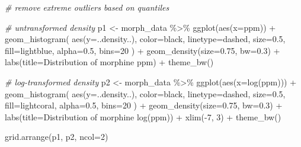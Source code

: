 \documentclass[
  11pt,
]{article}
\newenvironment{Shaded}{\begin{snugshade}}{\end{snugshade}}
\newcommand{\AttributeTok}[1]{\textcolor[rgb]{0.77,0.63,0.00}{#1}}
\newcommand{\CommentTok}[1]{\textcolor[rgb]{0.56,0.35,0.01}{\textit{#1}}}
\newcommand{\DecValTok}[1]{\textcolor[rgb]{0.00,0.00,0.81}{#1}}
\newcommand{\FloatTok}[1]{\textcolor[rgb]{0.00,0.00,0.81}{#1}}
\newcommand{\FunctionTok}[1]{\textcolor[rgb]{0.00,0.00,0.00}{#1}}
\newcommand{\NormalTok}[1]{#1}
\newcommand{\OtherTok}[1]{\textcolor[rgb]{0.56,0.35,0.01}{#1}}
\newcommand{\SpecialCharTok}[1]{\textcolor[rgb]{0.00,0.00,0.00}{#1}}
\newcommand{\StringTok}[1]{\textcolor[rgb]{0.31,0.60,0.02}{#1}}
\begin{document}
\begin{Shaded}
\begin{Highlighting}[]
\CommentTok{\# remove extreme outliers based on quantiles}

\CommentTok{\# untransformed density}
\NormalTok{p1 }\OtherTok{\textless{}{-}}\NormalTok{ morph\_data }\SpecialCharTok{\%\textgreater{}\%}
  \FunctionTok{ggplot}\NormalTok{(}\FunctionTok{aes}\NormalTok{(}\AttributeTok{x=}\NormalTok{ppm)) }\SpecialCharTok{+}
    \FunctionTok{geom\_histogram}\NormalTok{(}
      \FunctionTok{aes}\NormalTok{(}\AttributeTok{y=}\NormalTok{..density..), }
      \AttributeTok{color=}\StringTok{\textquotesingle{}black\textquotesingle{}}\NormalTok{, }
      \AttributeTok{linetype=}\StringTok{\textquotesingle{}dashed\textquotesingle{}}\NormalTok{,}
      \AttributeTok{size=}\FloatTok{0.5}\NormalTok{,}
      \AttributeTok{fill=}\StringTok{\textquotesingle{}lightblue\textquotesingle{}}\NormalTok{, }
      \AttributeTok{alpha=}\FloatTok{0.5}\NormalTok{,}
      \AttributeTok{bins=}\DecValTok{20}
\NormalTok{    ) }\SpecialCharTok{+}
    \FunctionTok{geom\_density}\NormalTok{(}\AttributeTok{size=}\FloatTok{0.75}\NormalTok{, }\AttributeTok{bw=}\FloatTok{0.3}\NormalTok{) }\SpecialCharTok{+}
    \FunctionTok{labs}\NormalTok{(}\AttributeTok{title=}\StringTok{\textquotesingle{}Distribution of morphine ppm\textquotesingle{}}\NormalTok{) }\SpecialCharTok{+}
    \FunctionTok{theme\_bw}\NormalTok{()}

\CommentTok{\# log{-}transformed density}
\NormalTok{p2 }\OtherTok{\textless{}{-}}\NormalTok{ morph\_data }\SpecialCharTok{\%\textgreater{}\%}
  \FunctionTok{ggplot}\NormalTok{(}\FunctionTok{aes}\NormalTok{(}\AttributeTok{x=}\FunctionTok{log}\NormalTok{(ppm))) }\SpecialCharTok{+}
    \FunctionTok{geom\_histogram}\NormalTok{(}
      \FunctionTok{aes}\NormalTok{(}\AttributeTok{y=}\NormalTok{..density..), }
      \AttributeTok{color=}\StringTok{\textquotesingle{}black\textquotesingle{}}\NormalTok{, }
      \AttributeTok{linetype=}\StringTok{\textquotesingle{}dashed\textquotesingle{}}\NormalTok{,}
      \AttributeTok{size=}\FloatTok{0.5}\NormalTok{,}
      \AttributeTok{fill=}\StringTok{\textquotesingle{}lightcoral\textquotesingle{}}\NormalTok{, }
      \AttributeTok{alpha=}\FloatTok{0.5}\NormalTok{,}
      \AttributeTok{bins=}\DecValTok{20}
\NormalTok{    ) }\SpecialCharTok{+}
    \FunctionTok{geom\_density}\NormalTok{(}\AttributeTok{size=}\FloatTok{0.75}\NormalTok{, }\AttributeTok{bw=}\FloatTok{0.3}\NormalTok{) }\SpecialCharTok{+}
    \FunctionTok{labs}\NormalTok{(}\AttributeTok{title=}\StringTok{\textquotesingle{}Distribution of morphine log(ppm)\textquotesingle{}}\NormalTok{) }\SpecialCharTok{+}
    \FunctionTok{xlim}\NormalTok{(}\SpecialCharTok{{-}}\DecValTok{7}\NormalTok{, }\DecValTok{3}\NormalTok{) }\SpecialCharTok{+}
    \FunctionTok{theme\_bw}\NormalTok{()}

\FunctionTok{grid.arrange}\NormalTok{(p1, p2, }\AttributeTok{ncol=}\DecValTok{2}\NormalTok{)}
\end{Highlighting}
\end{Shaded}
\end{document}
